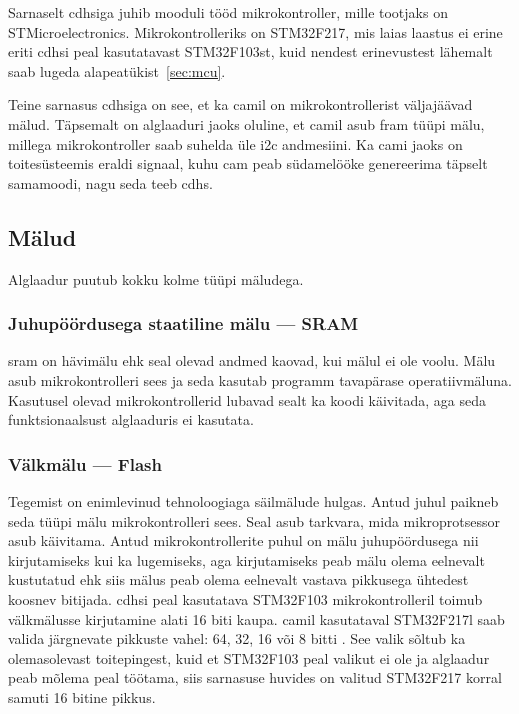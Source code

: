 \documentclass[12pt,a4paper]{article}
\begin{document}
Sarnaselt \gls{cdhs}iga juhib mooduli tööd mikrokontroller, mille tootjaks on
STMicroelectronics. Mikrokontrolleriks on STM32F217, mis laias laastus ei erine
eriti \gls{cdhs}i peal kasutatavast STM32F103st, kuid nendest erinevustest
lähemalt saab lugeda alapeatükist~\ref{sec:mcu}.

Teine sarnasus \gls{cdhs}iga on see, et ka \gls{cam}il on mikrokontrollerist
väljajäävad mälud. Täpsemalt on alglaaduri jaoks oluline, et \gls{cam}il asub
\gls{fram} tüüpi mälu, millega mikrokontroller saab suhelda üle \gls{i2c}
andmesiini.  Ka \gls{cam}i jaoks on toitesüsteemis eraldi signaal, kuhu
\gls{cam} peab südamelööke genereerima täpselt samamoodi, nagu seda teeb
\gls{cdhs}.

\subsection{Mälud}
\label{sec:m2lud}
Alglaadur puutub kokku kolme tüüpi mäludega.

\subsubsection{Juhupöördusega staatiline mälu --- SRAM}
\Gls{sram} on hävimälu ehk seal olevad andmed kaovad, kui mälul ei ole voolu.
Mälu asub mikrokontrolleri sees ja seda kasutab programm tavapärase
operatiivmäluna.  Kasutusel olevad mikrokontrollerid lubavad sealt ka
koodi käivitada, aga seda funktsionaalsust alglaaduris ei kasutata.

\subsubsection{Välkmälu --- Flash}
Tegemist on enimlevinud tehnoloogiaga säilmälude hulgas. Antud juhul paikneb
seda tüüpi mälu mikrokontrolleri sees. Seal asub tarkvara, mida mikroprotsessor
asub käivitama. Antud mikrokontrollerite puhul on mälu juhupöördusega nii
kirjutamiseks kui ka lugemiseks, aga kirjutamiseks peab mälu olema eelnevalt
kustutatud ehk siis mälus peab olema eelnevalt vastava pikkusega ühtedest
koosnev bitijada. \gls{cdhs}i peal kasutatava STM32F103 mikrokontrolleril toimub
välkmälusse kirjutamine alati 16 biti kaupa. \gls{cam}il kasutataval STM32F217l
saab valida järgnevate pikkuste vahel: 64, 32, 16 või 8 bitti \cite{f2fpm}. See
valik sõltub ka olemasolevast toitepingest, kuid et STM32F103 peal valikut ei
ole ja alglaadur peab mõlema peal töötama, siis sarnasuse huvides on valitud
STM32F217 korral samuti 16 bitine pikkus.
\end{document}
